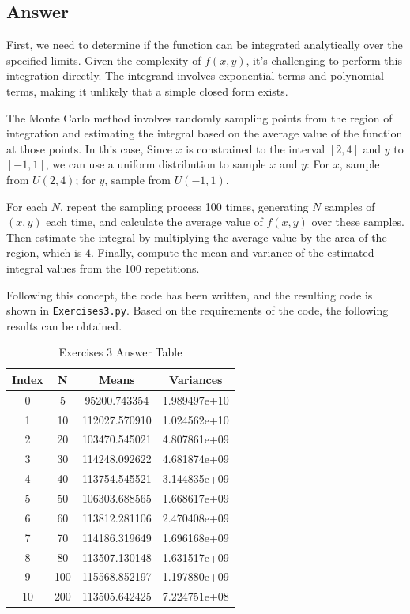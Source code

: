 \documentclass[a4paper, utf8]{ctexart}
\begin{document}
	\subsection{Answer}
	
	First, we need to determine if the function can be integrated analytically over the specified limits. Given the complexity of $f(x,y)$, it's challenging to perform this integration directly. The integrand involves exponential terms and polynomial terms, making it unlikely that a simple closed form exists.
	
	The Monte Carlo method involves randomly sampling points from the region of integration and estimating the integral based on the average value of the function at those points. In this case, Since $x$ is constrained to the interval $[2,4]$ and $y$ to $[−1,1]$, we can use a uniform distribution to sample $x$ and $y$: For $x$, sample from $U(2,4)$; for $y$, sample from $U(−1,1)$.
	
	For each $N$, repeat the sampling process 100 times, generating $N$ samples of $(x,y)$ each time, and calculate the average value of $f(x,y)$ over these samples. Then estimate the integral by multiplying the average value by the area of the region, which is $4$. Finally, compute the mean and variance of the estimated integral values from the 100 repetitions.
	
	Following this concept, the code has been written, and the resulting code is shown in \verb|Exercises3.py|. Based on the requirements of the code, the following results can be obtained.
	
	\begin{table}[http]
		\begin{center}
			\caption{Exercises 3 Answer Table}
			\begin{tabular}{c c c c}
				\hline
				Index & N & Means & Variances \\
				\hline
				0 &    5 &  95200.743354 & 1.989497e+10 \\
				1 &  10 & 112027.570910 & 1.024562e+10 \\
				2 &  20 & 103470.545021 & 4.807861e+09 \\
				3 &  30 & 114248.092622 & 4.681874e+09 \\
				4 &  40 & 113754.545521 & 3.144835e+09 \\
				5 &  50 & 106303.688565 & 1.668617e+09 \\
				6 &  60 & 113812.281106 & 2.470408e+09 \\ 
				7 &  70 & 114186.319649 & 1.696168e+09 \\ 
				8 &  80 & 113507.130148 & 1.631517e+09 \\ 
				9 & 100 & 115568.852197 & 1.197880e+09 \\ 
				10 & 200 & 113505.642425 & 7.224751e+08 \\
				\hline
			\end{tabular}
		\end{center}
	\end{table}
	
\end{document}
